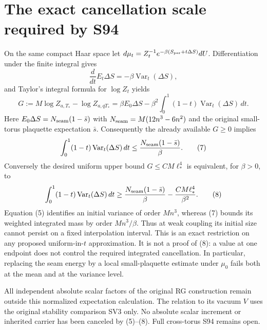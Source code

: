\documentclass{article}
\begin{document}
\section{The exact cancellation scale required by S94}
On the same compact Haar space let
$d\mu_t=Z_t^{-1}e^{-\beta(S_{\rm per}+t\Delta S)}dU$.
Differentiation under the finite integral gives
\[
 \frac{d}{dt}E_t\Delta S=-\beta\operatorname{Var}_t(\Delta S),
\]
and Taylor's integral formula for $\log Z_t$ yields
\[
 G:=M\log Z_{a,T_*}-\log Z_{a,qT_*}
 =\beta E_0\Delta S-
 \beta^2\int_0^1(1-t)\operatorname{Var}_t(\Delta S)\,dt.
 \tag{6}
\]
Here $E_0\Delta S=N_{\rm seam}(1-\bar s)$ with
$N_{\rm seam}=M(12n^3-6n^2)$ and the original small-torus plaquette expectation $\bar s$. Consequently the already available $G\geq0$ implies
\[
 \int_0^1(1-t)\operatorname{Var}_t(\Delta S)\,dt
 \leq \frac{N_{\rm seam}(1-\bar s)}{\beta}.
 \tag{7}
\]
Conversely the desired uniform upper bound $G\leq C M\ell_*^4$ is equivalent, for $\beta>0$, to
\[
 \int_0^1(1-t)\operatorname{Var}_t(\Delta S)\,dt
 \geq \frac{N_{\rm seam}(1-\bar s)}{\beta}
 -\frac{CM\ell_*^4}{\beta^2}.
 \tag{8}
\]
Equation (5) identifies an initial variance of order $Mn^3$, whereas (7) bounds its weighted integrated mass by order $Mn^3/\beta$. Thus at weak coupling its initial size cannot persist on a fixed interpolation interval. This is an exact restriction on any proposed uniform-in-$t$ approximation. It is not a proof of (8): a value at one endpoint does not control the required integrated cancellation. In particular, replacing the seam energy by a local small-plaquette estimate under $\mu_0$ fails both at the mean and at the variance level.

All independent absolute scalar factors of the original RG construction remain outside this normalized expectation calculation. The relation to its vacuum $V$ uses the original stability comparison SV3 only. No absolute scalar increment or inherited carrier has been canceled by (5)--(8). Full cross-torus S94 remains open.
\end{document}
